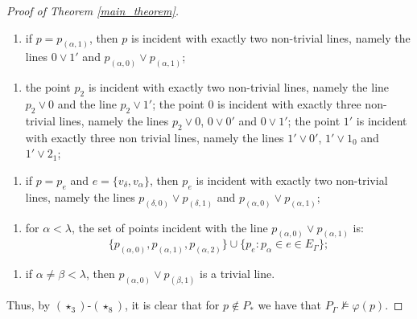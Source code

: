 \documentclass{amsart}
\numberwithin{claimcounter}{theorem}
\begin{document}
\begin{proof}[Proof of Theorem \ref{main_theorem}]
\begin{enumerate}[$(\star_3)$]
\end{enumerate} 
\begin{enumerate}[$(\star_4)$]
	\item if $p = p_{(\alpha, 1)}$, then $p$ is incident with exactly two non-trivial lines, namely the lines $0 \vee 1'$ and $p_{(\alpha, 0)} \vee p_{(\alpha, 1)}$;
\end{enumerate}
\begin{enumerate}[$(\star_5)$]
	\item the point $p_2$ is incident with exactly two non-trivial lines, namely the line $p_2 \vee 0$ and the line $p_2 \vee 1'$; the point $0$ is incident with exactly three non-trivial lines, namely the lines $p_2 \vee 0$, $0 \vee 0'$ and $0 \vee 1'$; the point $1'$ is incident with exactly three non trivial lines, namely the lines $1' \vee 0'$, $1' \vee 1_0$ and $1' \vee 2_1$;
\end{enumerate} 
\begin{enumerate}[$(\star_6)$]
	\item if $p = p_{e}$ and $e = \{ v_{\delta}, v_{\alpha} \}$, then $p_{e}$ is incident with exactly two non-trivial lines, namely the lines $p_{(\delta, 0)} \vee p_{(\delta, 1)}$ and $p_{(\alpha, 0)} \vee p_{(\alpha, 1)}$;
\end{enumerate}
\begin{enumerate}[$(\star_7)$]
	\item for $\alpha < \lambda$, the set of points incident with the line $p_{(\alpha, 0)} \vee p_{(\alpha, 1)}$ is:
	$$\{ p_{(\alpha, 0)}, p_{(\alpha, 1)}, p_{(\alpha, 2)} \} \cup \{ p_{e} : p_{\alpha} \in e \in E_{\Gamma} \};$$
\end{enumerate} 
\begin{enumerate}[$(\star_8)$]
	\item if  $\alpha \neq \beta < \lambda$, then $p_{(\alpha, 0)} \vee p_{(\beta, 1)}$ is a trivial line.
\end{enumerate}      
Thus, by $(\star_3)$-$(\star_8)$, it is clear that for $p \notin P_*$ we have that $P_{\Gamma} \not\models \varphi(p)$.


\end{proof}
\end{document}
